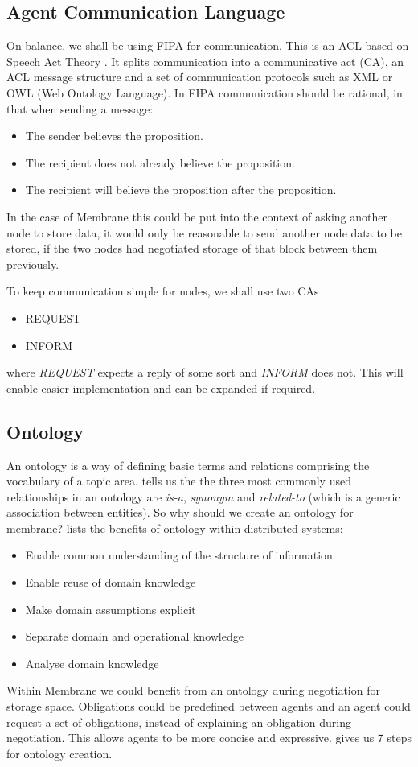 \documentclass[a4paper, 11pt, twocolumn, twoside]{report}
\begin{document}
\subsection{Agent Communication Language}

On balance, we shall be using FIPA for communication. This is an ACL based on Speech Act Theory \citep{labrou1999agent}. It splits communication into a communicative act (CA), an ACL message structure and a set of communication protocols such as XML or OWL (Web Ontology Language). In FIPA communication should be rational, in that when sending a message:
\begin{itemize}
  \item The sender believes the proposition.
  \item The recipient does not already believe the proposition.
  \item The recipient will believe the proposition after the proposition.
\end{itemize}
In the case of Membrane this could be put into the context of asking another node to store data, it would only be reasonable to send another node data to be stored, if the two nodes had negotiated storage of that block between them previously.

To keep communication simple for nodes, we shall use two CAs
\begin{itemize}
  \item REQUEST
  \item INFORM
\end{itemize}
where \emph{REQUEST} expects a reply of some sort and \emph{INFORM} does not. This will enable easier implementation and can be expanded if required.

\subsection{Ontology}

An ontology is a way of defining basic terms and relations comprising the vocabulary of a topic area. \cite{sugumaran2002ontologies} tells us the the three most commonly used relationships in an ontology are \emph{is-a}, \emph{synonym} and \emph{related-to} (which is a generic association between entities). So why should we create an ontology for membrane? \cite{noy2001ontology} lists the benefits of ontology within distributed systems:
\begin{itemize}
 \item Enable common understanding of the structure of information
 \item Enable reuse of domain knowledge
 \item Make domain assumptions explicit
 \item Separate domain and operational knowledge
 \item Analyse domain knowledge
\end{itemize}
Within Membrane we could benefit from an ontology during negotiation for storage space. Obligations could be predefined between agents and an agent could request a set of obligations, instead of explaining an obligation during negotiation. This allows agents to be more concise and expressive. \cite{noy2001ontology} gives us 7 steps for ontology creation.
\end{document}
